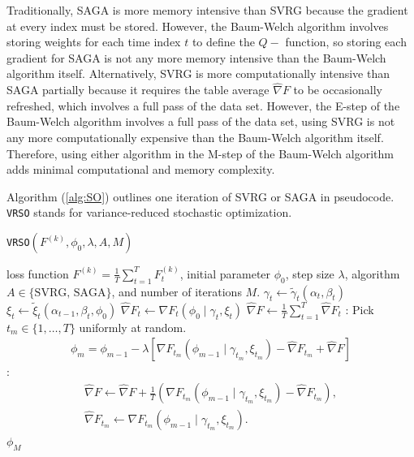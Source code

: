 Traditionally, SAGA is more memory intensive than SVRG because the gradient at every index must be stored. However, the Baum-Welch algorithm involves storing weights for each time index $t$ to define the $Q-$ function, so storing each gradient for SAGA is not any more memory intensive than the Baum-Welch algorithm itself. Alternatively, SVRG is more computationally intensive than SAGA partially because it requires the table average $\widehat \nabla F$ to be occasionally refreshed, which involves a full pass of the data set. However, the E-step of the Baum-Welch algorithm involves a full pass of the data set, using SVRG is not any more computationally expensive than the Baum-Welch algorithm itself. Therefore, using either algorithm in the M-step of the Baum-Welch algorithm adds minimal computational and memory complexity.


Algorithm (\ref{alg:SO}) outlines one iteration of SVRG or SAGA in pseudocode. \texttt{VRSO} stands for variance-reduced stochastic optimization.

\begin{algorithm}
\caption{\texttt{VRSO}$(F^{(k)},\phi_0,\lambda,A,M)$}\label{alg:SO}
\begin{algorithmic}[1]
\Require loss function $F^{(k)} = \frac{1}{T}\sum_{t=1}^T F^{(k)}_t$, initial parameter $\phi_0$, step size $\lambda$, algorithm $A \in \{\text{SVRG, SAGA}\}$, and number of iterations $M$.
%
\vspace{5pt}
\State $\gamma_t \gets \tilde \gamma_t(\alpha_t,\beta_t)$
\State $\xi_t \gets \tilde \xi_t(\alpha_{t-1},\beta_{t},\phi_0)$
\State $\widehat \nabla F_t \leftarrow \nabla F_t (\phi_0 \mid \gamma_t,\xi_t)$
\EndFor
\State $\widehat \nabla F \gets \frac{1}{T} \sum_{t=1}^T \widehat \nabla F_{t}$
%
:
    \State Pick $t_{m} \in \{1,\ldots,T\}$ uniformly at random.
    \State {}
    \begin{gather}
        \phi_{m} = \phi_{m-1} - \lambda \left[\nabla F_{t_m}(\phi_{m-1} \mid \gamma_{t_m}, \xi_{t_m}) - \widehat \nabla F_{t_{m}} + \widehat \nabla F \right]
        \label{eqn:SAGA_update0}
    \end{gather}
    :
        \begin{gather}
            \widehat \nabla F \gets \widehat \nabla F + \frac{1}{T} \left( \nabla F_{t_m}(\phi_{m-1} \mid \gamma_{t_m}, \xi_{t_m}) - \widehat \nabla F_{t_{m}}\right), \\
            \widehat \nabla F_{t_{m}} \gets \nabla F_{t_m}(\phi_{m-1} \mid \gamma_{t_m}, \xi_{t_m}).
        \end{gather}
    \EndIf
\EndFor
\State \Return $\phi_M$
\end{algorithmic}
\end{algorithm}




